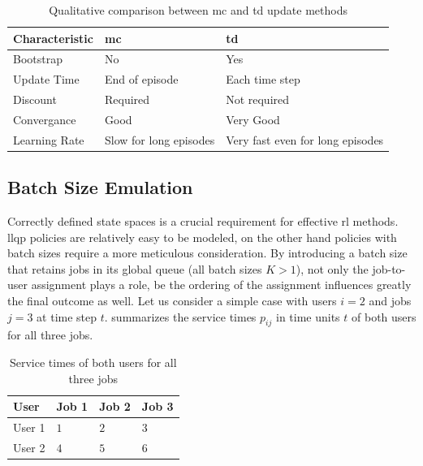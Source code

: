 \documentclass{seal_thesis}
\begin{document}
\begin{table}[!ht]
\centering
\begin{tabular}{@{}lll@{}}
\toprule
Characteristic & \gls{mc}                     & \gls{td}                               \\ \midrule
Bootstrap      & No                     & Yes                              \\
Update Time    & End of episode         & Each time step                   \\
Discount       & Required               & Not required                     \\
Convergance    & Good                   & Very Good                        \\
Learning Rate  & Slow for long episodes & Very fast even for long episodes \\ \bottomrule
\end{tabular}
\caption{Qualitative comparison between \gls{mc} and \gls{td} update methods \cite[p. 130]{Sutton2017}}
\label{tab:mc_td_comp}
\end{table}

\subsection{Batch Size Emulation}
\label{subsec:batch_size_emulation}

Correctly defined state spaces is a crucial requirement for effective \gls{rl} methods. \gls{llqp} policies are relatively easy to be modeled, on the other hand policies with batch sizes require a more meticulous consideration. By introducing a batch size that retains jobs in its global queue (\ie all batch sizes $K>1$), not only the job-to-user assignment plays a role, be the ordering of the assignment influences greatly the final outcome as well. Let us consider a simple case with users $i=2$ and jobs $j=3$ at time step $t$.  summarizes the service times $p_{ij}$ in time units $t$ of both users for all three jobs.

\begin{table}[!ht]
\centering
\begin{tabular}{@{}llll@{}}
\toprule
User   & Job 1 & Job 2 & Job 3 \\ \midrule
User 1 & $1$     & $2$     & $3$     \\
User 2 & $4$     & $5$     & $6$     \\ \bottomrule
\end{tabular}
\caption{Service times of both users for all three jobs}
\label{tab:users_service_times_example}
\end{table}
\end{document}
